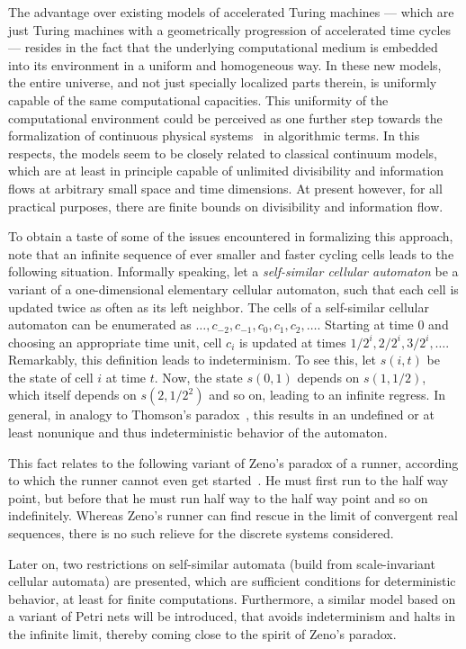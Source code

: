 \documentclass[pre,showpacs,showkeys,preprint]{revtex4}
\theoremstyle{definition}
\begin{document}
The advantage over existing models of accelerated Turing machines
--- which are just Turing machines with a geometrically progression of accelerated time cycles ---
resides in the fact that the underlying computational medium is embedded into its environment in a uniform and homogeneous way.
In these new models, the entire universe, and not just specially localized parts therein, is uniformly capable of the same computational capacities.
This uniformity of the computational environment could be perceived as one further step towards the formalization of continuous physical systems~\cite{CIEChapter2007} in algorithmic terms.
In this respects, the models seem to be closely related to classical continuum models, which are at least in principle capable of
unlimited divisibility and information flows at arbitrary small space and time dimensions.
At present however, for all practical purposes, there are finite bounds on divisibility and information flow.

To obtain a taste of some of the issues encountered in formalizing this approach, note that
an infinite sequence of ever smaller and faster cycling cells leads to the following situation.
Informally speaking, let a {\em self-similar cellular automaton} be a variant of a one-dimensional elementary cellular automaton,
such that each cell is updated twice as often as its left neighbor.
The cells of a self-similar cellular automaton can be enumerated as $\ldots, c_{-2}, c_{-1}, c_{0}, c_{1}, c_{2}, \ldots$.
Starting at time 0 and choosing an appropriate time unit, cell $c_i$ is updated at
times $1 / 2^{i}, 2 /2^{i}, 3 / 2^{i}, \ldots$.
Remarkably, this definition leads to indeterminism.
To see this, let $s(i, t)$ be the state of cell $i$ at time $t$.
Now, the state $s(0, 1)$ depends on $s(1, 1/2)$, which itself depends on $s(2, 1/2^2)$ and so on,
leading to an infinite regress.
In general, in analogy to Thomson's paradox~\cite{salmon-01,1011191}, this results in an undefined or at least nonunique and thus indeterministic behavior of the automaton.

This fact relates to the following variant of Zeno's paradox of a runner,
according to which the runner cannot even get started~\cite{salmon-01}.
He must first run to the half way point, but before that he must run half way
to the half way point and so on indefinitely.
Whereas Zeno's runner can find rescue in the limit of convergent real sequences,
there is no such relieve for the discrete systems considered.

Later on, two restrictions on self-similar automata (build from scale-invariant cellular automata) are presented,
which are sufficient conditions for deterministic behavior, at least for finite computations.
Furthermore, a similar model based on a variant of Petri nets will be introduced, that avoids indeterminism and
halts in the infinite limit, thereby coming close to the spirit of Zeno's paradox.
\end{document}
